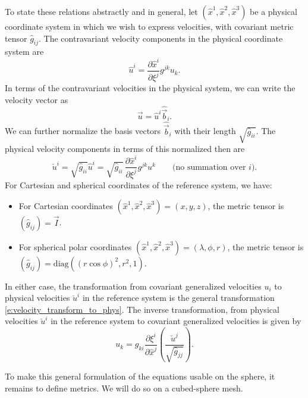 \documentclass{report}
\begin{document}
To state these relations abstractly and in general, let $(\hat x^1, \hat x^2, \hat x^3)$ be a physical coordinate system in which we wish to express velocities, with covariant metric tensor $\hat g_{ij}$. The contravariant velocity components in the physical coordinate system are 
\begin{equation}\label{e:velocity_transform_to_phys}
\hat u^i = \frac{\partial \hat x^i}{\partial \xi^j} g^{jk} u_k.
\end{equation}
In terms of the contravariant velocities in the physical system, we can write the velocity vector as
\[
\vec{u} = \hat u^i \hat{\vec{b}}_i.
\]
We can further normalize the basis vectors $\hat{\vec{b}}_i$ with their length $\sqrt{\hat g_{ii}}$. The physical velocity components in terms of this normalized then are
\begin{equation}\label{e:velocity_transform_to_phys}
\check{u}^i = \sqrt{\hat g_{ii}}\hat{u}^i = \sqrt{\hat g_{ii}} \, \frac{\partial \hat x^i}{\partial \xi^j} g^{jk} u^k \qquad \text{(no summation over $i$}).
\end{equation}
For Cartesian and spherical coordinates of the reference system, we have:
\begin{itemize}
\item For Cartesian coordinates $(\hat x^1, \hat x^2, \hat x^3)=(x, y, z)$, the metric tensor is $(\hat g_{ij}) = \vec{I}$.
\item For spherical polar coordinates $(\hat x^1, \hat x^2, \hat x^3)=(\lambda, \phi, r)$, the metric tensor is $(\hat g_{ij}) = \mathrm{diag}\left((r \cos \phi)^2, r^2,  1\right)$. 
\end{itemize}
In either case, the transformation from covariant generalized velocities $u_i$ to physical velocities $\check{u}^i$ in the reference system is the general transformation \eqref{e:velocity_transform_to_phys}. The inverse transformation, from physical velocities $\check{u}^i$ in the reference system to covariant generalized velocities is given by
\begin{equation}\label{e:velocity_transform_from_phys}
    u_k = g_{ki} \frac{\partial \xi^i}{\partial \hat x^j} \left(\frac{\check{u}^j}{\sqrt{\hat g_{jj}}}\right).
\end{equation}

To make this general formulation of the equations usable on the sphere, it remains to define metrics. We will do so on a cubed-sphere mesh.

\end{document}
